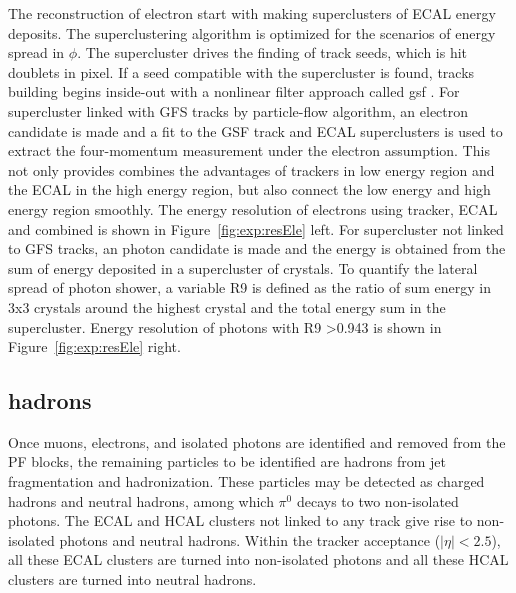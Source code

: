 The reconstruction of electron start with making superclusters of ECAL energy deposits. The superclustering algorithm is optimized for the scenarios of energy spread in $\phi$. The supercluster drives the finding of track seeds, which is hit doublets in pixel. If a seed compatible with the supercluster is found, tracks building begins inside-out with a nonlinear filter approach called \acrfull{gsf} \cite{tech:gsf:Adam:2005bya}. For supercluster linked with GFS tracks by particle-flow algorithm, an electron candidate is made and a fit to the GSF track and ECAL superclusters is used to extract the four-momentum measurement under the electron assumption. This not only provides combines the advantages of trackers in low energy region and the ECAL in the high energy region, but also connect the low energy and high energy region smoothly. The energy resolution of electrons using tracker, ECAL and combined is shown in Figure~\ref{fig:exp:resEle} left. For supercluster not linked to GFS tracks, an photon candidate is made and the energy is obtained from the sum of energy deposited in a supercluster of crystals. To quantify the lateral spread of photon shower, a variable R9 is defined as the ratio of sum energy in 3x3 crystals around the highest crystal and the total energy sum in the supercluster. Energy resolution of photons with R9 >0.943 is shown in Figure~\ref{fig:exp:resEle} right.



\subsection{hadrons}
Once muons, electrons, and isolated photons are identified and removed from the PF blocks, the remaining particles to be identified are hadrons from jet fragmentation and hadronization. These particles may be detected as charged hadrons and neutral hadrons, among which $\pi^0$ decays to two non-isolated photons. The ECAL and HCAL clusters not linked to any track give rise to non-isolated photons and neutral hadrons. Within the tracker acceptance ($|\eta|< 2.5$), all these ECAL clusters are turned into non-isolated photons and all these HCAL clusters are turned into neutral hadrons. 

